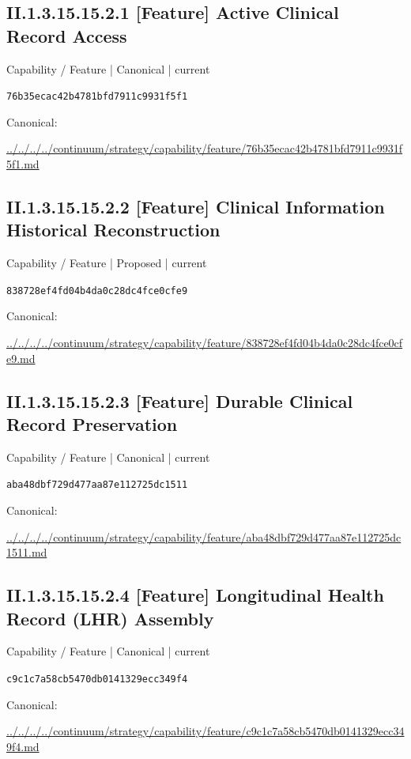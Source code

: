 \documentclass[10pt,a4paper]{article}
\begin{document}
\subsection*{II.1.3.15.15.2.1 [Feature] Active Clinical Record Access}
{\small Capability / Feature | Canonical | current}\par
\texttt{76b35ecac42b4781bfd7911c9931f5f1}\par
Canonical: \par
{\footnotesize\url{../../../../continuum/strategy/capability/feature/76b35ecac42b4781bfd7911c9931f5f1.md}}\par
\subsection*{II.1.3.15.15.2.2 [Feature] Clinical Information Historical Reconstruction}
{\small Capability / Feature | Proposed | current}\par
\texttt{838728ef4fd04b4da0c28dc4fce0cfe9}\par
Canonical: \par
{\footnotesize\url{../../../../continuum/strategy/capability/feature/838728ef4fd04b4da0c28dc4fce0cfe9.md}}\par
\subsection*{II.1.3.15.15.2.3 [Feature] Durable Clinical Record Preservation}
{\small Capability / Feature | Canonical | current}\par
\texttt{aba48dbf729d477aa87e112725dc1511}\par
Canonical: \par
{\footnotesize\url{../../../../continuum/strategy/capability/feature/aba48dbf729d477aa87e112725dc1511.md}}\par
\subsection*{II.1.3.15.15.2.4 [Feature] Longitudinal Health Record (LHR) Assembly}
{\small Capability / Feature | Canonical | current}\par
\texttt{c9c1c7a58cb5470db0141329ecc349f4}\par
Canonical: \par
{\footnotesize\url{../../../../continuum/strategy/capability/feature/c9c1c7a58cb5470db0141329ecc349f4.md}}\par
\end{document}
